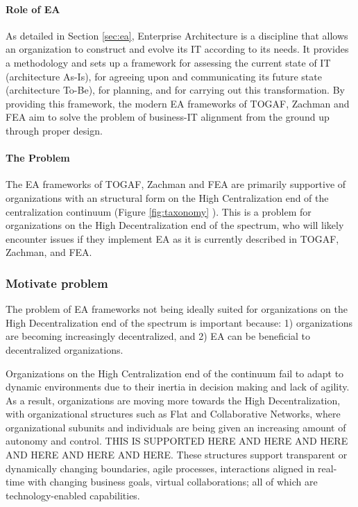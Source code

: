 
\paragraph*{Role of EA}

As detailed in Section \ref{sec:ea}, Enterprise Architecture is a discipline that allows an organization to construct and evolve its IT according to its needs. It provides a methodology and sets up a framework for assessing the current state of IT (architecture As-Is), for agreeing upon and communicating its future state (architecture To-Be), for planning, and for carrying out this transformation. By providing this framework, the modern EA frameworks of TOGAF, Zachman and FEA aim to solve the problem of business-IT alignment from the ground up through proper design. 

\paragraph*{The Problem} 

The EA frameworks of TOGAF, Zachman and FEA are primarily supportive of organizations with an structural form on the High Centralization end of the centralization continuum (Figure \ref{fig:taxonomy} ). This is a problem for organizations on the High Decentralization end of the spectrum, who will likely encounter issues if they implement EA as it is currently described in TOGAF, Zachman, and FEA. 



\subsubsection{Motivate problem} %

The problem of EA frameworks not being ideally suited for organizations on the High Decentralization end of the spectrum is important because: 1) organizations are becoming increasingly decentralized, and 2) EA can be beneficial to decentralized organizations. 

Organizations on the High Centralization end of the continuum fail to adapt to dynamic environments due to their inertia in decision making and lack of agility. As a result, organizations are moving more towards the High Decentralization, with organizational structures such as Flat and Collaborative Networks, where organizational subunits and individuals are being given an increasing amount of autonomy and control. THIS IS SUPPORTED HERE AND HERE AND HERE AND HERE AND HERE AND HERE. These structures support transparent or dynamically changing boundaries, agile processes, interactions aligned in real-time with changing business goals, virtual collaborations; all of which are technology-enabled capabilities.

